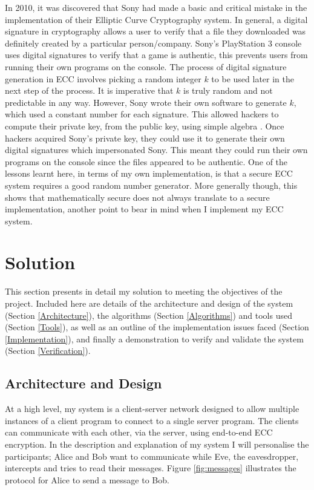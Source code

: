 \documentclass[12pt,a4paper]{article}
\begin{document}
In 2010, it was discovered that Sony had made a basic and critical mistake in the implementation of their Elliptic Curve Cryptography system. 
In general, a digital signature in cryptography allows a user to verify that a file they downloaded was definitely created by a particular person/company. 
Sony's PlayStation 3 console uses digital signatures to verify that a game is authentic, 
this prevents users from running their own programs on the console. 
The process of digital signature generation in ECC involves picking a random integer $k$ to be used later in the next step of the process. 
It is imperative that $k$ is truly random and not predictable in any way. 
However, Sony wrote their own software to generate $k$, which used a constant number for each signature. 
This allowed hackers to compute their private key, from the public key, using simple algebra \cite{hotz2010console}. 
Once hackers acquired Sony's private key, they could use it to generate their own digital signatures which impersonated Sony. 
This meant they could run their own programs on the console since the files appeared to be authentic. 
One of the lessons learnt here, in terms of my own implementation, 
is that a secure ECC system requires a good random number generator. 
More generally though, this shows that mathematically secure does not always translate to a secure implementation, 
another point to bear in mind when I implement my ECC system. 



\section{Solution} \noindent
This section presents in detail my solution to meeting the objectives of the project. 
Included here are details of the architecture and design of the system (Section \ref{Architecture}), 
the algorithms (Section \ref{Algorithms}) and tools used (Section \ref{Tools}), 
as well as an outline of the implementation issues faced (Section \ref{Implementation}), 
and finally a demonstration to verify and validate the system (Section \ref{Verification}). 

\subsection{Architecture and Design} \noindent \label{Architecture}
At a high level, my system is a client-server network designed to allow 
multiple instances of a client program to connect to a single server program. 
The clients can communicate with each other, via the server, using end-to-end ECC encryption. 
In the description and explanation of my system I will personalise the participants; 
Alice and Bob want to communicate while Eve, the eavesdropper, intercepts and tries to read their messages. 
Figure \ref{fig:messages} illustrates the protocol for Alice to send a message to Bob. 
\end{document}
